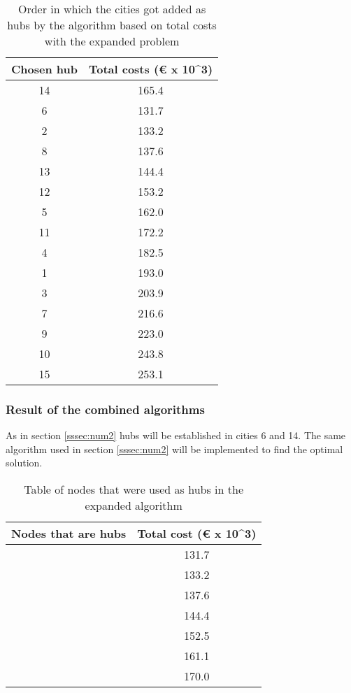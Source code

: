 \documentclass{article}
\begin{document}
\begin{table}[h]
    \centering
    \begin{tabular}{||c|c||}
    \hline
        Chosen hub & Total costs (€ x 10^3) \\
    \hline
    \hline
        14 & 165.4 \\
        \hline
        6 & 131.7 \\
        \hline
        2 & 133.2 \\
        \hline
        8 & 137.6 \\
        \hline
        13 & 144.4 \\
        \hline
        12 & 153.2 \\
        \hline
        5 & 162.0 \\
        \hline
        11 & 172.2 \\
        \hline
        4 & 182.5 \\
        \hline
        1 & 193.0 \\
        \hline
        3 & 203.9 \\
        \hline
        7 & 216.6 \\
        \hline
        9 & 223.0 \\
        \hline
        10 & 243.8 \\
        \hline
        15 & 253.1 \\
        \hline
    \end{tabular}
    \caption{\centering Order in which the cities got added as hubs by the algorithm based on total costs with the expanded problem}
    \label{tab:DistAlgExp2}
\end{table}

\subsubsection{Result of the combined algorithms}

As in section \ref{sssec:num2} hubs will be established in cities 6 and 14. The same algorithm used in section \ref{sssec:num2} will be implemented to find the optimal solution. 

\begin{table}[h]
\begin{tabular}{||c |c||}
\hline
Nodes that are hubs & Total cost (€ x 10^3)\\
\hline
\hline
[6,14] &  131.7 \\
\hline
[6,14,2]   & 133.2\\
\hline
[6,14,2,8] & 137.6 \\
\hline
[6,14,2,8,13]  & 144.4  \\
\hline
[6,14,2,8,13,15] & 152.5 \\
\hline
[6,14,2,8,13,15,12] & 161.1 \\
\hline
[6,14,2,8,13,15,12,5] & 170.0 \\
\hline
\end{tabular}
\caption{Table of nodes that were used as hubs in the expanded algorithm}
\end{table}
\end{document}
